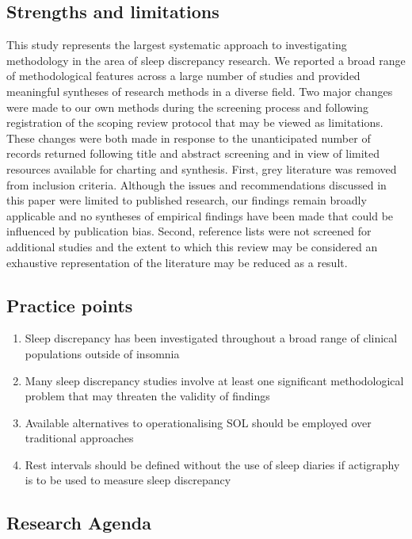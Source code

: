 \documentclass[
]{article}
\providecommand{\tightlist}{%
  \setlength{\itemsep}{0pt}\setlength{\parskip}{0pt}}
\begin{document}
\subsection{Strengths and limitations}\label{item20}

This study represents the largest systematic approach to investigating methodology in the area of sleep discrepancy research. We reported a broad range of methodological features across a large number of studies and provided meaningful syntheses of research methods in a diverse field. Two major changes were made to our own methods during the screening process and following registration of the scoping review protocol that may be viewed as limitations. These changes were both made in response to the unanticipated number of records returned following title and abstract screening and in view of limited resources available for charting and synthesis. First, grey literature was removed from inclusion criteria. Although the issues and recommendations discussed in this paper were limited to published research, our findings remain broadly applicable and no syntheses of empirical findings have been made that could be influenced by publication bias. Second, reference lists were not screened for additional studies and the extent to which this review may be considered an exhaustive representation of the literature may be reduced as a result.

\subsection{Practice points}\label{practice-points}

\begin{enumerate}
\def\labelenumi{\arabic{enumi}.}
\tightlist
\item
  Sleep discrepancy has been investigated throughout a broad range of clinical populations outside of insomnia
\item
  Many sleep discrepancy studies involve at least one significant methodological problem that may threaten the validity of findings
\item
  Available alternatives to operationalising SOL should be employed over traditional approaches
\item
  Rest intervals should be defined without the use of sleep diaries if actigraphy is to be used to measure sleep discrepancy
\end{enumerate}

\subsection{Research Agenda}\label{research-agenda}
\end{document}
